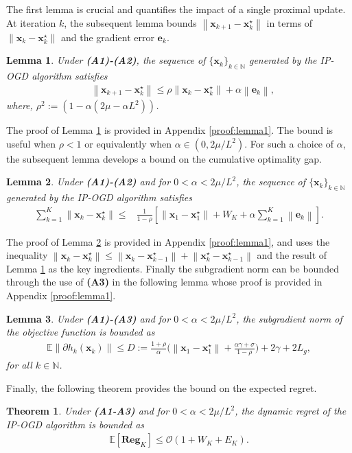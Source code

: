\documentclass[draftcls,onecolumn,12pt]{IEEEtran}
\theoremstyle{plain}
\newtheorem{thm}{Theorem}
\newtheorem{lem}{Lemma}
\def\x{\mathbf{x}}
\def\e{\mathbf{e}}
\def\N{\mathbb{N}}
\def\xks{\x_k^\star}
\def\EE{\mathbb{E}}
\providecommand{\norm}[1]{\left\|#1\right\|}
\providecommand{\Ex}[1]{\mathbb{E}\left[#1\right]}
\theoremstyle{plain}
\theoremstyle{remark}
\begin{document}
The first lemma is crucial and quantifies the impact of a single proximal update. At iteration $k$, the subsequent lemma bounds $\norm{\x_{k+1}-\xks}$ in terms of $\norm{\x_k-\xks}$ and the gradient error $\e_k$.   
	  		\begin{lem}\label{lem1}
	  			Under \textbf{(A1)-(A2)}, the sequence of  $\{\x_k\}_{k\in\N}$ generated by the IP-OGD algorithm satisfies 
	  			\begin{align}\label{Lemma_1}
	  			&\norm{\x_{k+1} - \xks}\leq \rho \norm{\x_{k} - \xks}+\alpha\norm{\e_k},
	  			\end{align}
	  				where, $\rho^2:= \left(1  - \alpha(2\mu - \alpha L^{2})\right)$.
	  		\end{lem}
The proof of Lemma \ref{lem1} is provided in Appendix \ref{proof:lemma1}. The bound is useful when $\rho < 1$ or equivalently when $\alpha \in (0, 2\mu/L^2)$. For such a choice of $\alpha$, the subsequent lemma develops a bound on the cumulative optimality gap. 
\begin{lem}\label{lem2}
	Under \textbf{(A1)-(A2)} and for $0<\alpha < 2\mu/L^2$, the sequence of $\{{\x}_k\}_{k\in\N}$ generated by the IP-OGD algorithm satisfies
	  			\begin{align}
	  			\!\!\!\!\!\!\sum\limits_{k=1}^{K}\norm{{\x}_{k}- \xks }  \leq & \frac{1}{1-\rho}\left[\!\norm{{\x}_{1} \!- \x_{1}^\star} \!+\! W_K  \!+\!  \alpha\sum\limits_{k=1}^{K} \norm{\e_k}\right]. 
	  			\end{align}
\end{lem}	
The proof of Lemma \ref{lem2} is provided in Appendix \ref{proof:lemma1}, and uses the  inequality $\norm{\x_k-\xks} \leq \norm{\x_k-\x_{k-1}^\star} + \norm{\xks-\x_{k-1}^\star}$ and the result of Lemma \ref{lem1} as the key ingredients. Finally the subgradient norm can be bounded through the use of \textbf{(A3)} in the following lemma whose proof is provided in Appendix \ref{proof:lemma1}. 
\begin{lem}\label{lemsg} 
Under \textbf{(A1)-(A3)} and for $0<\alpha < 2\mu/L^2$, the subgradient norm of the objective function is bounded as
\begin{align}
\!\!\!\!\EE\norm{\partial h_k(\!\x_k\!)}\!\leq\! D\!:=\!\frac{1\!+\!\rho}{\alpha} \bigg(\!\!\!\norm{{\x}_{1} \!\!- \!\x_{1}^\star} \!+\!  \frac{\alpha \gamma \!+\! \sigma}{1\!-\!\rho} \bigg) \!\! +\!\! 2\gamma \!\!+\!\! 2L_g,
\end{align}
for all $k\in\N$. 
\end{lem} 

Finally, the following theorem provides the bound on the expected regret. 
\begin{thm}\label{thm1}
Under \textbf{(A1-A3)} and for $0<\alpha < 2\mu/L^2$, the dynamic regret of the IP-OGD algorithm is bounded as
\begin{align} \label{regret1}
	\Ex{\mathbf{Reg}_K}\leq \mathcal{O}(1+W_K+E_K).
\end{align}
\end{thm}
\end{document}
